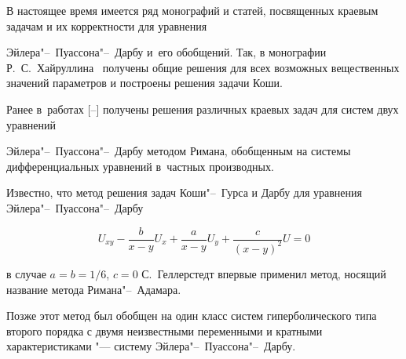 


\date{17/III/2015} %








\makerutitle



\smallskip %



В настоящее время имеется ряд монографий и статей, посвященных краевым задачам и их корректности для уравнения 

Эйлера"--~Пуассона"--~Дарбу и~его обобщений. Так, в монографии Р.~С.~Хайруллина~\cite{Hairullin} получены общие решения для всех возможных вещественных значений параметров и построены решения задачи Коши. 

Ранее в~работах [--] получены решения различных краевых задач для систем двух уравнений 

Эйлера"--~Пуассона"--~Дарбу методом Римана\cite{Riemann}, обобщенным на системы дифференциальных уравнений в~частных производных.



Известно, что метод решения задач Коши"--~Гурса и Дарбу для уравнения Эйлера"--~Пуассона"--~Дарбу  

$$U_{xy}-\frac{b}{x-y}U_x+\frac{a}{x-y}U_y+\frac{c}{(x-y)^2}U=0$$ 

в случае $a=b=1/6$, $c=0$  С.~Геллерстедт \cite{Gel} впервые применил метод, носящий название метода Римана"--~Адамара. 

Позже этот метод был обобщен \cite{Andreev,spicin} на один класс систем гиперболического типа второго порядка с двумя неизвестными переменными и кратными характеристиками "--- систему Эйлера"--~Пуассона"--~Дарбу.



